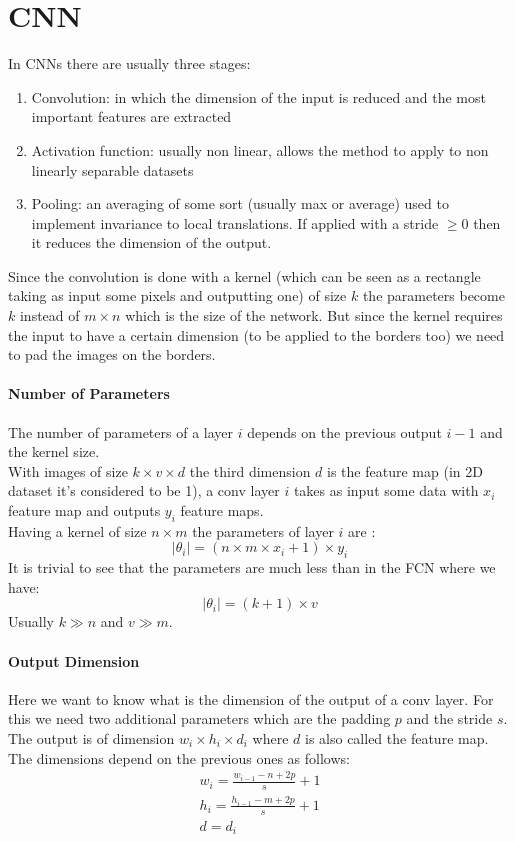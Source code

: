 \section{CNN}
In CNNs there are usually three stages:
\begin{enumerate}
\item Convolution: in which the dimension of the input is reduced and the most important features are extracted
\item Activation function: usually non linear, allows the method to apply to non linearly separable datasets
\item Pooling: an averaging of some sort (usually max or average) used to implement invariance to local translations. If applied with a stride $\ge 0$ then it reduces the dimension of the output.
\end{enumerate}

Since the convolution is done with a kernel (which can be seen as a rectangle taking as input some pixels and outputting one) of size $k$ the parameters become $k$ instead of $m \times n$ which is the size of the network. But since the kernel requires the input to have a certain dimension (to be applied to the borders too) we need to pad the images on the borders.

\paragraph{Number of Parameters}
The number of parameters of a layer $i$ depends on the previous output $i-1$ and the kernel size.\\
With images of size $k \times  v \times d$ the third dimension $d$ is the feature map (in 2D dataset it's considered to be 1), a conv layer $i$ takes as input some data with $x_i$ feature map and outputs $y_i$ feature maps.\\
Having a kernel of size $n \times m$ the parameters of layer $i$ are :
$$|\theta_i|=(n\times m\times x_i +1)\times y_i$$
It is trivial to see that the parameters are much less than in the FCN where we have:
$$|\theta_i|=(k +1 ) \times v$$
Usually $ k \gg n$ and $v \gg m$.

\paragraph{Output Dimension}
Here we want to know what is the dimension of the output of a conv layer. For this we need two additional parameters which are the padding $p$ and the stride $s$. The output is of dimension $w_i \times h_i \times d_i$ where $d$ is also called the feature map.\\
The dimensions depend on the previous ones as follows:
\begin{equation}
\begin{aligned}
w_i=\frac{w_{i-1}-n+2p}{s}+1\\
h_i=\frac{h_{i-1}-m+2p}{s}+1\\
d=d_i
\end{aligned}
\end{equation}